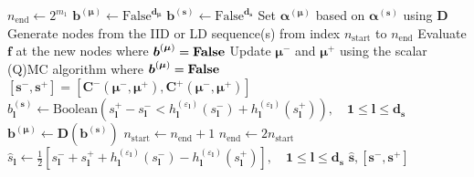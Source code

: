 \documentclass[graybox]{svmult}
\begin{document}
\begin{algorithm}[t]
\begin{algorithmic}
    \State $n_\text{end} \gets 2^{m_1}$ 
    \State $\boldsymbol{b}^{(\boldsymbol{\mu})} \gets \text{False}^{\boldsymbol{d}_{\boldsymbol{\mu}}}$ 
    \State $\boldsymbol{b}^{(\boldsymbol{s})} \gets \text{False}^{\boldsymbol{d}_{\boldsymbol{s}}}$ 
    \State Set $\boldsymbol{\alpha}^{(\boldsymbol{\mu})}$ based on $\boldsymbol{\alpha}^{(\boldsymbol{s})}$ using $\boldsymbol{D}$ 
     
        \State Generate nodes from the IID or LD sequence(s) from index $n_\text{start}$ to $n_\text{end}$
        \State Evaluate $\boldsymbol{f}$ at the new nodes where $\boldsymbol{b}^{(\boldsymbol{\mu})}=\textbf{\text{False}}$ 
        \State Update $\boldsymbol{\mu}^-$ and $\boldsymbol{\mu}^+$ using the scalar (Q)MC algorithm where $\boldsymbol{b}^{(\boldsymbol{\mu})}=\textbf{\text{False}}$
        \State $[\boldsymbol{s}^-,\boldsymbol{s}^+] = \left[\boldsymbol{C}^-(\boldsymbol{\mu}^-,\boldsymbol{\mu}^+),\boldsymbol{C}^+(\boldsymbol{\mu}^-,\boldsymbol{\mu}^+)\right]$ 
        \State $b^{(\boldsymbol{s})}_{\boldsymbol{l}} \gets \text{Boolean}\left(s_{\boldsymbol{l}}^+-s_{\boldsymbol{l}}^- < h^{(\varepsilon_{\boldsymbol{l}})}_{\boldsymbol{l}}(s_{\boldsymbol{l}}^-)+h^{(\varepsilon_{\boldsymbol{l}})}_{\boldsymbol{l}}(s_{\boldsymbol{l}}^+)\right),\quad \boldsymbol{1} \leq \boldsymbol{l} \leq \boldsymbol{d}_{\boldsymbol{s}}$ 
        \State $\boldsymbol{b}^{(\boldsymbol{\mu})} \gets \boldsymbol{D}\left(\boldsymbol{b}^{(\boldsymbol{s})}\right)$
        \State $n_\text{start} \gets n_\text{end}+1$
        \State $n_\text{end} \gets 2n_\text{start}$
    \EndWhile
    \State $\hat{s}_{\boldsymbol{l}} \gets \frac{1}{2}[s_{\boldsymbol{l}}^-+s_{\boldsymbol{l}}^++h^{(\varepsilon_{\boldsymbol{l}})}_{\boldsymbol{l}}(s_{\boldsymbol{l}}^-)-h^{(\varepsilon_{\boldsymbol{l}})}_{\boldsymbol{l}}(s_{\boldsymbol{l}}^+)], \quad\boldsymbol{1} \leq \boldsymbol{l} \leq \boldsymbol{d}_{\boldsymbol{s}}$ 
    \State \Return $\hat{\boldsymbol{s}},[\boldsymbol{s}^-,\boldsymbol{s}^+]$
    \end{algorithmic}
\end{algorithm}
\end{document}
